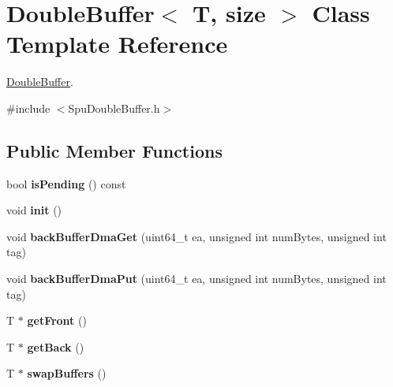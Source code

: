 \hypertarget{classDoubleBuffer}{}\section{Double\+Buffer$<$ T, size $>$ Class Template Reference}
\label{classDoubleBuffer}


\hyperlink{classDoubleBuffer}{Double\+Buffer}.  




{\ttfamily \#include $<$Spu\+Double\+Buffer.\+h$>$}

\subsection*{Public Member Functions}
\begin{DoxyCompactItemize}
\item 
\mbox{\label{classDoubleBuffer_a8d84c459e8febdc58193e4b38291cee9}} 
bool {\bfseries is\+Pending} () const
\item 
\mbox{\label{classDoubleBuffer_a2e55ca9c30cc6e8520ddf00d703da8e9}} 
void {\bfseries init} ()
\item 
\mbox{\label{classDoubleBuffer_a85edf900d1585b1454e4759239dcd487}} 
void {\bfseries back\+Buffer\+Dma\+Get} (uint64\+\_\+t ea, unsigned int num\+Bytes, unsigned int tag)
\item 
\mbox{\label{classDoubleBuffer_a44bd5f04a1167e7940f06a0886267cbc}} 
void {\bfseries back\+Buffer\+Dma\+Put} (uint64\+\_\+t ea, unsigned int num\+Bytes, unsigned int tag)
\item 
\mbox{\label{classDoubleBuffer_a0cd355ac290ae18f8fbaaad35af7c958}} 
T $\ast$ {\bfseries get\+Front} ()
\item 
\mbox{\label{classDoubleBuffer_a201455b0ab67f953c544dd55b72e7527}} 
T $\ast$ {\bfseries get\+Back} ()
\item 
\mbox{\label{classDoubleBuffer_a06fe8a51a32d791c8589669593291a6c}} 
T $\ast$ {\bfseries swap\+Buffers} ()
\item 
\mbox{\label{classDoubleBuffer_a8d84c459e8febdc58193e4b38291cee9}} 

\end{DoxyCompactItemize}
